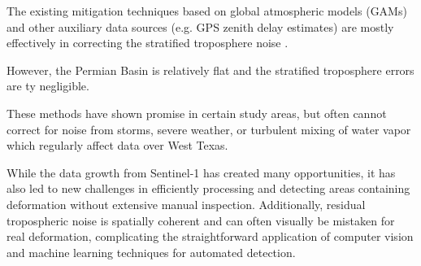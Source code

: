 The existing mitigation techniques based on global atmospheric models (GAMs) and other auxiliary data sources (e.g. GPS zenith delay estimates) are mostly effectively in correcting the stratified troposphere noise \citep{Lauknes2011InsarTroposphericStratification, Bekaert2015SpatiallyVariablePower, Doin2009CorrectionsStratifiedTropospheric, Li2005InterferometricSyntheticAperture,Ding2008AtmosphericEffectsInsar}.

However, the Permian Basin is relatively flat and the stratified troposphere errors are ty negligible. 

These methods have shown promise in certain study areas, but often cannot correct for noise from storms, severe weather, or turbulent mixing of water vapor which regularly affect data over West Texas.


While the data growth from Sentinel-1 has created many opportunities, it has also led to new challenges in efficiently processing and detecting areas containing deformation without extensive manual inspection.
Additionally, residual tropospheric noise is spatially coherent and can often visually be mistaken for real deformation, complicating the straightforward application of computer vision and machine learning techniques for automated detection.
